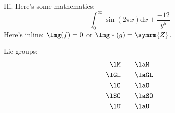 \documentclass{bsteffan-exsheet}
\author{Ben Steffan}
\begin{document}
\maketitle
Hi. Here's some mathematics:
\[
	\int_0^\infty \sin(2\pi x) \mathrm{d}x + \frac{-12}{y^5}
\]
Here's inline: $\Img(f) = 0$ or $\Img*(g) = \symrm{Z}$.

Lie groups:
\begin{align*}
	\lM 	&\qquad \laM  \\
	\lGL 	&\qquad \laGL \\
	\lO 	&\qquad \laO  \\
	\lSO 	&\qquad \laSO \\
	\lU 	&\qquad \laU
\end{align*}
\end{document}
